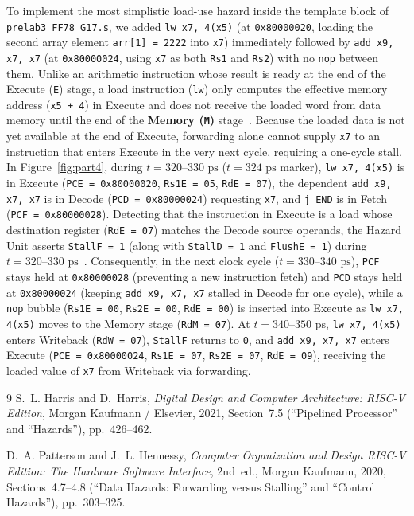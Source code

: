 \documentclass[11pt,a4paper]{article}
\begin{document}
To implement the most simplistic load-use hazard inside the template block of \texttt{prelab3\_FF78\_G17.s}, we added \texttt{lw x7, 4(x5)} (at \texttt{0x80000020}, loading the second array element \texttt{arr[1] = 2222} into \texttt{x7}) immediately followed by \texttt{add x9, x7, x7} (at \texttt{0x80000024}, using \texttt{x7} as both \texttt{Rs1} and \texttt{Rs2}) with no \texttt{nop} between them. Unlike an arithmetic instruction whose result is ready at the end of the Execute (\texttt{E}) stage, a load instruction (\texttt{lw}) only computes the effective memory address (\texttt{x5 + 4}) in Execute and does not receive the loaded word from data memory until the end of the \textbf{Memory (\texttt{M})} stage~\cite{harris2021,patterson2020}. Because the loaded data is not yet available at the end of Execute, forwarding alone cannot supply \texttt{x7} to an instruction that enters Execute in the very next cycle, requiring a one-cycle stall. In Figure~\ref{fig:part4}, during $t = 320\text{--}330\text{ ps}$ ($t = 324\text{ ps}$ marker), \texttt{lw x7, 4(x5)} is in Execute (\texttt{PCE = 0x80000020}, \texttt{Rs1E = 05}, \texttt{RdE = 07}), the dependent \texttt{add x9, x7, x7} is in Decode (\texttt{PCD = 0x80000024}) requesting \texttt{x7}, and \texttt{j END} is in Fetch (\texttt{PCF = 0x80000028}). Detecting that the instruction in Execute is a load whose destination register (\texttt{RdE = 07}) matches the Decode source operands, the Hazard Unit asserts \texttt{StallF = 1} (along with \texttt{StallD = 1} and \texttt{FlushE = 1}) during $t = 320\text{--}330\text{ ps}$~\cite{harris2021}. Consequently, in the next clock cycle ($t = 330\text{--}340\text{ ps}$), \texttt{PCF} stays held at \texttt{0x80000028} (preventing a new instruction fetch) and \texttt{PCD} stays held at \texttt{0x80000024} (keeping \texttt{add x9, x7, x7} stalled in Decode for one cycle), while a \texttt{nop} bubble (\texttt{Rs1E = 00}, \texttt{Rs2E = 00}, \texttt{RdE = 00}) is inserted into Execute as \texttt{lw x7, 4(x5)} moves to the Memory stage (\texttt{RdM = 07}). At $t = 340\text{--}350\text{ ps}$, \texttt{lw x7, 4(x5)} enters Writeback (\texttt{RdW = 07}), \texttt{StallF} returns to \texttt{0}, and \texttt{add x9, x7, x7} enters Execute (\texttt{PCE = 0x80000024}, \texttt{Rs1E = 07}, \texttt{Rs2E = 07}, \texttt{RdE = 09}), receiving the loaded value of \texttt{x7} from Writeback via forwarding.

\vspace{0.1em}
\begin{thebibliography}{9}
\small
\setlength{\itemsep}{2pt}
S.~L. Harris and D.~Harris, \emph{Digital Design and Computer Architecture: RISC-V Edition}, Morgan Kaufmann / Elsevier, 2021, Section~7.5 (``Pipelined Processor'' and ``Hazards''), pp.~426--462.

D.~A. Patterson and J.~L. Hennessy, \emph{Computer Organization and Design RISC-V Edition: The Hardware Software Interface}, 2nd~ed., Morgan Kaufmann, 2020, Sections~4.7--4.8 (``Data Hazards: Forwarding versus Stalling'' and ``Control Hazards''), pp.~303--325.
\end{thebibliography}
\end{document}

